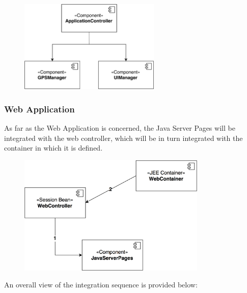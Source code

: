 \begin{figure}[H]
\begin{center}
		\includegraphics[width=0.6\textwidth]{./integration_strategy/diagrams/mobile.png}
\end{center}
\end{figure}

\subsubsection{Web Application}
As far as the Web Application is concerned, the Java Server Pages will be integrated with the web controller, which will be in turn integrated with the container in which it is defined.

\begin{figure}[H]
\begin{center}
		\includegraphics[width=0.8\textwidth]{./integration_strategy/diagrams/web.png}
\end{center}
\end{figure}

An overall view of the integration sequence is provided below:


